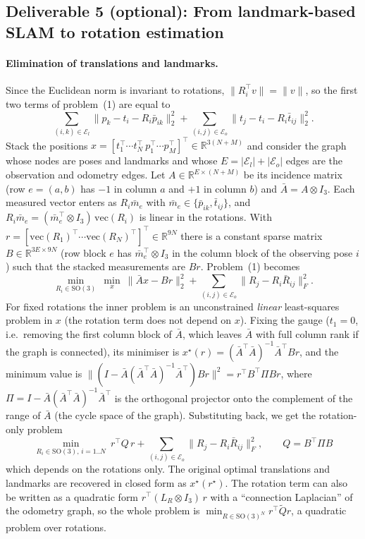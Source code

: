 \subsection{Deliverable 5 (optional): From landmark-based SLAM to rotation estimation}\label{sec:d5}

\paragraph{Elimination of translations and landmarks.}
Since the Euclidean norm is invariant to rotations, $\|R_i^\top v\|=\|v\|$, so the first two
terms of problem~(1) are equal to
\begin{equation}
\sum_{(i,k)\in\mathcal{E}_l}\|p_k-t_i-R_i\bar p_{ik}\|_2^2
+\sum_{(i,j)\in\mathcal{E}_o}\|t_j-t_i-R_i\bar t_{ij}\|_2^2 .
\end{equation}
Stack the positions $x=[t_1^\top\cdots t_N^\top\ p_1^\top\cdots p_M^\top]^\top\in\mathbb{R}^{3(N+M)}$
and consider the graph whose nodes are poses and landmarks and whose $E=|\mathcal{E}_l|+|\mathcal{E}_o|$
edges are the observation and odometry edges. Let $A\in\mathbb{R}^{E\times(N+M)}$ be its
incidence matrix (row $e=(a,b)$ has $-1$ in column $a$ and $+1$ in column $b$) and
$\bar A=A\otimes I_3$. Each measured vector enters as $R_i\bar m_e$ with $\bar m_e\in\{\bar p_{ik},\bar t_{ij}\}$,
and $R_i\bar m_e=(\bar m_e^\top\otimes I_3)\,\mathrm{vec}(R_i)$ is linear in the rotations.
With $r=[\mathrm{vec}(R_1)^\top\cdots\mathrm{vec}(R_N)^\top]^\top\in\mathbb{R}^{9N}$ there is a
constant sparse matrix $B\in\mathbb{R}^{3E\times 9N}$ (row block $e$ has
$\bar m_e^\top\otimes I_3$ in the column block of the observing pose $i$) such that the
stacked measurements are $Br$. Problem~(1) becomes
\begin{equation}
\min_{R_i\in\mathrm{SO}(3)}\ \min_{x}\ \|\bar A x - Br\|_2^2 + \sum_{(i,j)\in\mathcal{E}_o}\|R_j-R_i\bar R_{ij}\|_F^2 .
\end{equation}
For fixed rotations the inner problem is an unconstrained \emph{linear} least-squares
problem in $x$ (the rotation term does not depend on $x$). Fixing the gauge ($t_1=0$, i.e.\
removing the first column block of $\bar A$, which leaves $\bar A$ with full column rank if
the graph is connected), its minimiser is
$x^\star(r)=(\bar A^\top\bar A)^{-1}\bar A^\top B r$, and the minimum value is
$\|(I-\bar A(\bar A^\top\bar A)^{-1}\bar A^\top)Br\|^2=r^\top B^\top \Pi B r$, where
$\Pi=I-\bar A(\bar A^\top\bar A)^{-1}\bar A^\top$ is the orthogonal projector onto the
complement of the range of $\bar A$ (the cycle space of the graph). Substituting back, we get
the rotation-only problem
\begin{equation}
\boxed{\ \min_{R_i\in\mathrm{SO}(3),\,i=1..N}\ r^\top Q\, r+\sum_{(i,j)\in\mathcal{E}_o}\|R_j-R_i\bar R_{ij}\|_F^2,\qquad Q=B^\top\Pi B\ }
\end{equation}
which depends on the rotations only. The original optimal translations and landmarks are
recovered in closed form as $x^\star(r^\star)$. The rotation term can also be written as a
quadratic form $r^\top (L_R\otimes I_3)\,r$ with a ``connection Laplacian'' of the odometry
graph, so the whole problem is $\min_{R\in\mathrm{SO}(3)^N} r^\top \tilde Q r$, a quadratic
problem over rotations.


